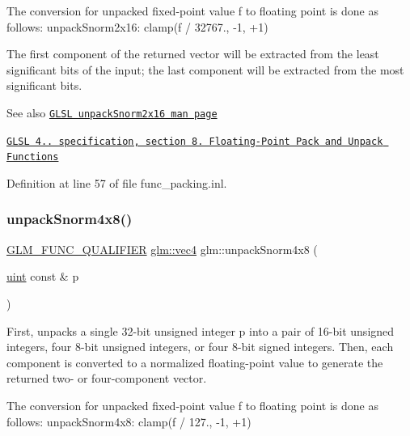The conversion for unpacked fixed-\/point value f to floating point is done as follows\+: unpack\+Snorm2x16\+: clamp(f / 32767., -\/1, +1)

The first component of the returned vector will be extracted from the least significant bits of the input; the last component will be extracted from the most significant bits.

\begin{DoxySeeAlso}{See also}
\href{http://www.opengl.org/sdk/docs/manglsl/xhtml/unpackSnorm2x16.xml}{\tt G\+L\+SL unpack\+Snorm2x16 man page} 

\href{http://www.opengl.org/registry/doc/GLSLangSpec.4.20.8.pdf}{\tt G\+L\+SL 4.. specification, section 8. Floating-\/\+Point Pack and Unpack Functions} 
\end{DoxySeeAlso}


Definition at line 57 of file func\+\_\+packing.\+inl.

\mbox{\label{group__core__func__packing_ga126a0deffef1f2d10dd67237981a870b}} 
\subsubsection{\texorpdfstring{unpack\+Snorm4x8()}{unpackSnorm4x8()}}
{\footnotesize\ttfamily \hyperlink{setup_8hpp_a33fdea6f91c5f834105f7415e2a64407}{G\+L\+M\+\_\+\+F\+U\+N\+C\+\_\+\+Q\+U\+A\+L\+I\+F\+I\+ER} \hyperlink{group__core__types_ga5881b1b022d7fd1b7218f5916532dd02}{glm\+::vec4} glm\+::unpack\+Snorm4x8 (\begin{DoxyParamCaption}\item[{\hyperlink{group__core__precision_ga4fd29415871152bfb5abd588334147c8}{uint} const \&}]{p }\end{DoxyParamCaption})}

First, unpacks a single 32-\/bit unsigned integer p into a pair of 16-\/bit unsigned integers, four 8-\/bit unsigned integers, or four 8-\/bit signed integers. Then, each component is converted to a normalized floating-\/point value to generate the returned two-\/ or four-\/component vector.

The conversion for unpacked fixed-\/point value f to floating point is done as follows\+: unpack\+Snorm4x8\+: clamp(f / 127., -\/1, +1)

